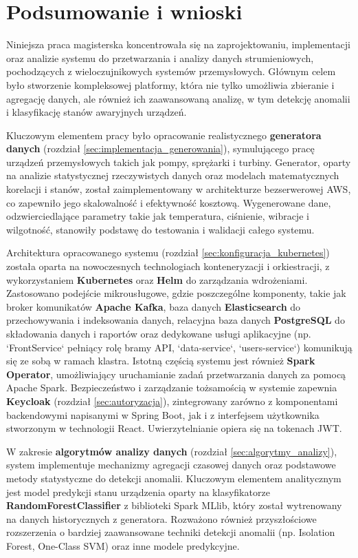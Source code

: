 \section{Podsumowanie i wnioski}
\label{sec:podsumowanie_wnioski}

Niniejsza praca magisterska koncentrowała się na zaprojektowaniu, implementacji oraz analizie systemu do przetwarzania i analizy danych strumieniowych, pochodzących z wieloczujnikowych systemów przemysłowych. Głównym celem było stworzenie kompleksowej platformy, która nie tylko umożliwia zbieranie i agregację danych, ale również ich zaawansowaną analizę, w tym detekcję anomalii i klasyfikację stanów awaryjnych urządzeń.

Kluczowym elementem pracy było opracowanie realistycznego \textbf{generatora danych} (rozdział \ref{sec:implementacja_generowania}), symulującego pracę urządzeń przemysłowych takich jak pompy, sprężarki i turbiny. Generator, oparty na analizie statystycznej rzeczywistych danych oraz modelach matematycznych korelacji i stanów, został zaimplementowany w architekturze bezserwerowej AWS, co zapewniło jego skalowalność i efektywność kosztową. Wygenerowane dane, odzwierciedlające parametry takie jak temperatura, ciśnienie, wibracje i wilgotność, stanowiły podstawę do testowania i walidacji całego systemu.

Architektura opracowanego systemu (rozdział \ref{sec:konfiguracja_kubernetes}) została oparta na nowoczesnych technologiach konteneryzacji i orkiestracji, z wykorzystaniem \textbf{Kubernetes} oraz \textbf{Helm} do zarządzania wdrożeniami. Zastosowano podejście mikrousługowe, gdzie poszczególne komponenty, takie jak broker komunikatów \textbf{Apache Kafka}, baza danych \textbf{Elasticsearch} do przechowywania i indeksowania danych, relacyjna baza danych \textbf{PostgreSQL} do składowania danych i raportów oraz dedykowane usługi aplikacyjne (np. `FrontService` pełniący rolę bramy API, `data-service`, `users-service`) komunikują się ze sobą w ramach klastra. Istotną częścią systemu jest również \textbf{Spark Operator}, umożliwiający uruchamianie zadań przetwarzania danych za pomocą Apache Spark. Bezpieczeństwo i zarządzanie tożsamością w systemie zapewnia \textbf{Keycloak} (rozdział \ref{sec:autoryzacja}), zintegrowany zarówno z komponentami backendowymi napisanymi w Spring Boot, jak i z interfejsem użytkownika stworzonym w technologii React. Uwierzytelnianie opiera się na tokenach JWT.

W zakresie \textbf{algorytmów analizy danych} (rozdział \ref{sec:algorytmy_analizy}), system implementuje mechanizmy agregacji czasowej danych oraz podstawowe metody statystyczne do detekcji anomalii. Kluczowym elementem analitycznym jest model predykcji stanu urządzenia oparty na klasyfikatorze \textbf{RandomForestClassifier} z biblioteki Spark MLlib, który został wytrenowany na danych historycznych z generatora. Rozważono również przyszłościowe rozszerzenia o bardziej zaawansowane techniki detekcji anomalii (np. Isolation Forest, One-Class SVM) oraz inne modele predykcyjne.

